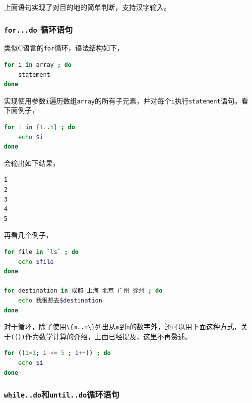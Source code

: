 \documentclass[doctor,openright,twoside]{sjtuthesis}
\newcommand{\passthrough}[1]{#1}
\theoremstyle{plain}
\theoremstyle{definition}
\theoremstyle{remark}
\theoremstyle{ocrenumbox}
\theoremstyle{plain}
\begin{document}
上面语句实现了对目的地的简单判断，支持汉字输入。

\hypertarget{for...do-}{%
\subsubsection{\texorpdfstring{\texttt{for...do} 循环语句}{for...do 循环语句}}\label{for...do-}}

类似C语言的\passthrough{\lstinline!for!}循环，语法结构如下，

\begin{lstlisting}[language=bash]
for i in array ; do
    statement
done
\end{lstlisting}

实现使用参数\passthrough{\lstinline!i!}遍历数组\passthrough{\lstinline!array!}的所有子元素，并对每个\passthrough{\lstinline!i!}执行\passthrough{\lstinline!statement!}语句。看下面例子，

\begin{lstlisting}[language=bash]
for i in {1..5} ; do
    echo $i
done
\end{lstlisting}

会输出如下结果，

\begin{lstlisting}[language=bash]
1
2
3
4
5
\end{lstlisting}

再看几个例子，

\begin{lstlisting}[language=bash]
for file in `ls` ; do
    echo $file
done

for destination in 成都 上海 北京 广州 徐州 ; do
    echo 我很想去$destination
done
\end{lstlisting}

对于循环，除了使用\passthrough{\lstinline!\{m..n\}!}列出从\passthrough{\lstinline!m!}到\passthrough{\lstinline!n!}的数字外，还可以用下面这种方式，关于\passthrough{\lstinline!(())!}作为数学计算的介绍，上面已经提及，这里不再赘述。

\begin{lstlisting}[language=bash]
for ((i=1; i <= 5 ; i++)) ; do
    echo $i
done
\end{lstlisting}

\hypertarget{while..dountil..do}{%
\subsubsection{\texorpdfstring{\texttt{while..do}和\texttt{until..do}循环语句}{while..do和until..do循环语句}}\label{while..dountil..do}}
\end{document}
